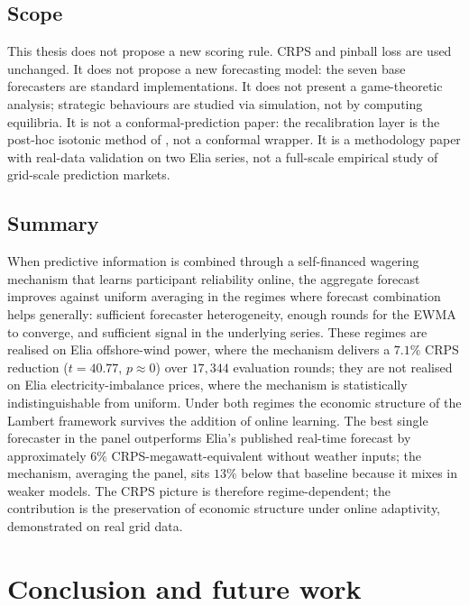 \documentclass[
  11pt,
  a4paper,
  oneside]{report}
\begin{document}
\section{Scope}\label{scope-1}

This thesis does not propose a new scoring rule. CRPS and pinball loss
are used unchanged. It does not propose a new forecasting model: the
seven base forecasters are standard implementations. It does not present
a game-theoretic analysis; strategic behaviours are studied via
simulation, not by computing equilibria. It is not a
conformal-prediction paper: the recalibration layer is the post-hoc
isotonic method of \citet{kuleshov2018accurate}, not a conformal
wrapper. It is a methodology paper with real-data validation on two Elia
series, not a full-scale empirical study of grid-scale prediction
markets.

\section{Summary}\label{summary-1}

When predictive information is combined through a self-financed wagering
mechanism that learns participant reliability online, the aggregate
forecast improves against uniform averaging in the regimes where
forecast combination helps generally: sufficient forecaster
heterogeneity, enough rounds for the EWMA to converge, and sufficient
signal in the underlying series. These regimes are realised on Elia
offshore-wind power, where the mechanism delivers a \(7.1\%\) CRPS
reduction (\(t = 40.77\), \(p \approx 0\)) over \(17{,}344\) evaluation
rounds; they are not realised on Elia electricity-imbalance prices,
where the mechanism is statistically indistinguishable from uniform.
Under both regimes the economic structure of the Lambert framework
survives the addition of online learning. The best single forecaster in
the panel outperforms Elia's published real-time forecast by
approximately \(6\%\) CRPS-megawatt-equivalent without weather inputs;
the mechanism, averaging the panel, sits \(13\%\) below that baseline
because it mixes in weaker models. The CRPS picture is therefore
regime-dependent; the contribution is the preservation of economic
structure under online adaptivity, demonstrated on real grid data.

\chapter{Conclusion and future work}\label{ch:conclusion}
\end{document}
